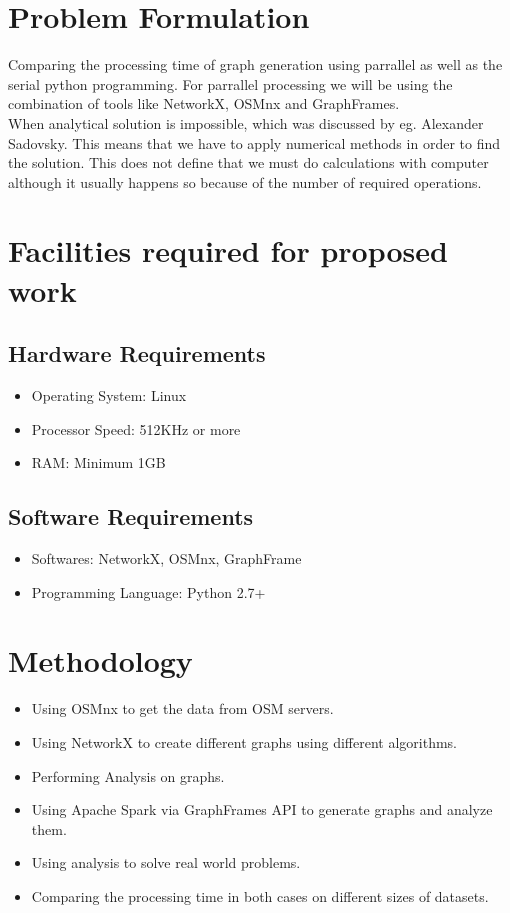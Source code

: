 \section{Problem Formulation}
 Comparing the processing time of graph generation using parrallel as well as the serial python programming. For parrallel processing we will be using the combination of tools like NetworkX, OSMnx and GraphFrames.\\
\noindent When analytical solution is impossible, which was discussed by eg. Alexander Sadovsky. This means that we have to apply numerical methods in order to find the solution. This does not define that we must do calculations with computer although it usually happens so because of the number of required operations.

\section{Facilities required for proposed work}
\subsection{Hardware Requirements}
\begin{itemize}
\item Operating System: Linux
\item Processor Speed: 512KHz or more
\item RAM: Minimum 1GB
\end{itemize}
\subsection{Software Requirements}
\begin{itemize}
\item Softwares: NetworkX, OSMnx, GraphFrame
\item Programming Language: Python 2.7+
\end{itemize}

\section{Methodology}
\begin{itemize}
\item Using OSMnx to get the data from OSM servers. 
\item Using NetworkX to create different graphs using different algorithms.
\item Performing Analysis on graphs.
\item Using Apache Spark via GraphFrames API to generate graphs and analyze them.
\item Using analysis to solve real world problems.
\item Comparing the processing time in both cases on different sizes of datasets.
\end{itemize}

